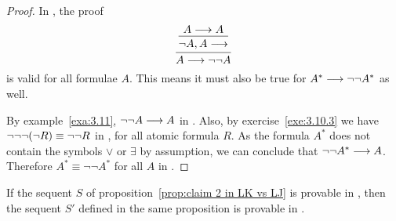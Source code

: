 \documentclass[11pt,a4paper]{article}
\begin{document}
\begin{proof}
    In \LJ{}, the proof
    \begin{equation*}
        \begin{prooftree}
            \hypo{A\seq A}
            \infer1{\lnot A, A\seq}
            \infer1{A\seq\lnot\lnot A}
        \end{prooftree}
    \end{equation*}
    is valid for all formulae \(A\). This means it must also be true for \(A^\ast\longrightarrow\lnot\lnot A^\ast\) as well.

    By example~\ref{exa:3.11}, \(\lnot\lnot A\longrightarrow A\) in .
    Also, by exercise~\ref{exe:3.10.3} we have \(\lnot\lnot\lnot(\lnot R)\equiv\lnot\lnot R\) in \LJ{},
    for all atomic formula \(R\).
    As the formula \(A^\ast\) does not contain the symbols \(\lor\) or \(\exists\) by assumption,
    we can conclude that \(\lnot\lnot A^\ast\longrightarrow A\).
    Therefore \(A^\ast\equiv \lnot\lnot A^\ast\) for all \(A\) in \LJ{}.
\end{proof}

\begin{proposition}[Claim 4]\label{prop:claim 4 in LK vs LJ}
    If the sequent \(S\) of proposition~\ref{prop:claim 2 in LK vs LJ} is provable in \LK,
    then the sequent \(S'\) defined in the same proposition is provable in \LJ.
\end{proposition}
\end{document}
